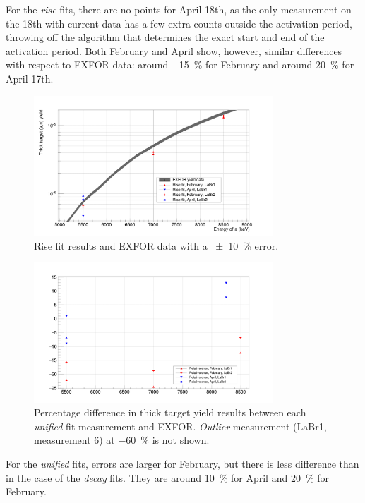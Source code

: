 \documentclass[a4paper,12pt]{report}
\begin{document}
For the \textit{rise} fits, there are no points for April 18th, as the only measurement on the 18th with current data has a few extra counts outside the activation period, throwing off the algorithm that determines the exact start and end of the activation period.
Both February and April show, however, similar differences with respect to EXFOR data: around \qty{-15}{\percent} for February and around \qty{+20}{\percent} for April 17th.

\begin{figure}[H]
	\centering
	\includegraphics[width=0.80\textwidth]{reactions_v_energy_rise.png}
	\caption{Rise fit results and EXFOR data with a \qty{\pm 10}{\percent} error.}
	\label{reactions_v_energy_rise}
\end{figure}

\begin{figure}[H]
	\centering
	\includegraphics[width=0.80\textwidth]{unified_errors_per.png}
	\caption{Percentage difference in thick target yield results between each \textit{unified} fit measurement and EXFOR.
	\textit{Outlier} measurement (LaBr1, measurement 6) at \qty{-60}{\percent} is not shown.}
	\label{unified_errors_per}
\end{figure}

For the \textit{unified} fits, errors are larger for February, but there is less difference than in the case of the \textit{decay} fits.
They are around \qty{10}{\percent} for April and \qty{20}{\percent} for February.
\end{document}
